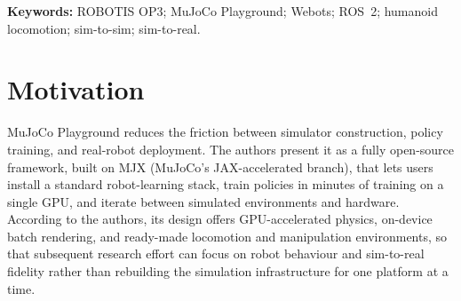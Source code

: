 \begin{abstract} This extended abstract studies whether the MuJoCo Playground
zero-shot sim-to-real recipe for humanoid joystick locomotion extends to the
ROBOTIS OP3 platform. MuJoCo Playground treats OP3 as a first-class humanoid
robot alongside Berkeley Humanoid, Unitree H1/G1, and Booster T1; however,
unlike these larger robotic platforms, zero-shot transfer to the OP3 hardware
was not reported in \citet{Zakka2025-demonstrating-mujoco-playground}. Our
contribution is an engineering audit of the path from the OP3 policy distributed
by MuJoCo Playground in simulation to an OP3-facing deployment stack, with
sim-to-sim testing through the ROBOTIS OP3 ROS~2 framework as a preliminary step
toward eventual sim-to-real deployment. We present the work as the first step of
a longer research programme that aims to combine reinforcement-learning
policies, motion scripts, and analytical control to improve the OP3's
football-playing skills. The central finding is that small mismatches in
observation conventions, command filtering, actuator stiffness, and
contact-friction modelling can determine whether a policy that walks in
simulation remains meaningful when moved through the deployment stack and onto
hardware.  \end{abstract}

\vspace{0.4em}
\noindent\textbf{Keywords:} ROBOTIS OP3; MuJoCo Playground; Webots; ROS~2; humanoid locomotion; sim-to-sim; sim-to-real.

\section{Motivation}

MuJoCo Playground \citep{Zakka2025-demonstrating-mujoco-playground} reduces the
friction between simulator construction, policy training, and real-robot
deployment. The authors present it as a fully open-source framework, built on
MJX (MuJoCo's JAX-accelerated branch), that lets users install a standard
robot-learning stack, train policies in minutes of training on a single GPU, and
iterate between simulated environments and hardware. According to the authors,
its design offers GPU-accelerated physics, on-device batch rendering, and
ready-made locomotion and manipulation environments, so that subsequent research
effort can focus on robot behaviour and sim-to-real fidelity rather than
rebuilding the simulation infrastructure for one platform at a time.

